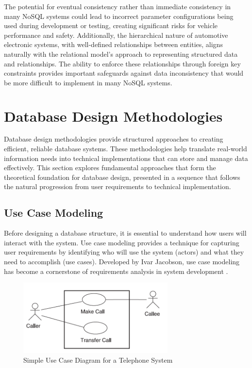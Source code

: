 The potential for eventual consistency rather than immediate consistency in many NoSQL systems could lead to incorrect parameter configurations being used during development or testing, creating significant risks for vehicle performance and safety. Additionally, the hierarchical nature of automotive electronic systems, with well-defined relationships between entities, aligns naturally with the relational model's approach to representing structured data and relationships. The ability to enforce these relationships through foreign key constraints provides important safeguards against data inconsistency that would be more difficult to implement in many NoSQL systems.

\section{Database Design Methodologies}
\label{sec:database-design-methodologies}

Database design methodologies provide structured approaches to creating efficient, reliable database systems. These methodologies help translate real-world information needs into technical implementations that can store and manage data effectively. This section explores fundamental approaches that form the theoretical foundation for database design, presented in a sequence that follows the natural progression from user requirements to technical implementation.

\subsection{Use Case Modeling}
\label{subsec:use-case-modeling}

Before designing a database structure, it is essential to understand how users will interact with the system. Use case modeling provides a technique for capturing user requirements by identifying who will use the system (actors) and what they need to accomplish (use cases). Developed by Ivar Jacobson, use case modeling has become a cornerstone of requirements analysis in system development \cite{jacobson2004use}.

\begin{figure}[ht]
    \centering
    \includegraphics[width=0.7\textwidth]{figures/use_case_diagram.png}
    \caption{Simple Use Case Diagram for a Telephone System \cite{jacobson2004use}}
    \label{fig:use-case-sample}
\end{figure}

